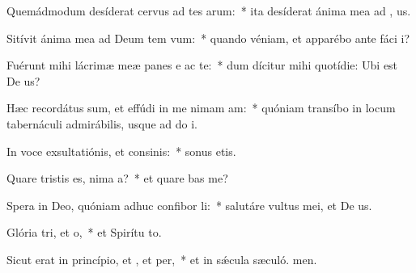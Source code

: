 \item Quemádmodum desíderat cervus ad tes arum:~* ita desíderat ánima mea ad , us.
\item Sitívit ánima mea ad Deum tem vum:~* quando véniam, et apparébo ante fáci i?
\item Fuérunt mihi lácrimæ meæ panes e ac te:~* dum dícitur mihi quotídie: Ubi est De us?
\item Hæc recordátus sum, et effúdi in me nimam am:~* quóniam transíbo in locum tabernáculi admirábilis, usque ad do i.
\item In voce exsultatiónis, et consinis:~* sonus etis.
\item Quare tristis es, nima a?~* et quare bas me?
\item Spera in Deo, quóniam adhuc confibor li:~* salutáre vultus mei, et De us.
\item Glória tri, et o,~* et Spirítu to.
\item Sicut erat in princípio, et , et per,~* et in sǽcula sæculó. men.
